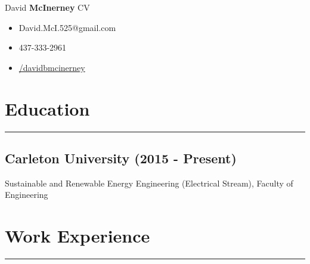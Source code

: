 \documentclass[11pt]{article}
\begin{document}
	\def\arraystretch{1.3}	 %
	\hspace*{-\parindent} %
	\begin{minipage}[b]{0.68\textwidth}
	\begin{flushleft}
	{\noindent \Huge David \textbf{McInerney} CV}
	\end{flushleft}	 
	\end{minipage}
	\begin{minipage}[b]{0.32\textwidth}
	\begin{itemize}
		\item[{\Large \faEnvelopeO}] David.McI.525@gmail.com
		\item[{\Large \faPhone}] 437-333-2961
    	\item[{\Large \faLinkedin}]   \href{http://www.linkedin.com/in/davidbmcinerney}{/davidbmcinerney}
	\end{itemize}

	\end{minipage}
	
	
	
	
	
	\section{Education}
		\hrule \hfill %
		\subsection{Carleton University (2015 - Present)}
		\noindent Sustainable and Renewable Energy Engineering (Electrical Stream), Faculty of Engineering 
	
	\section{Work Experience}
		\hrule \hfill %
\end{document}
